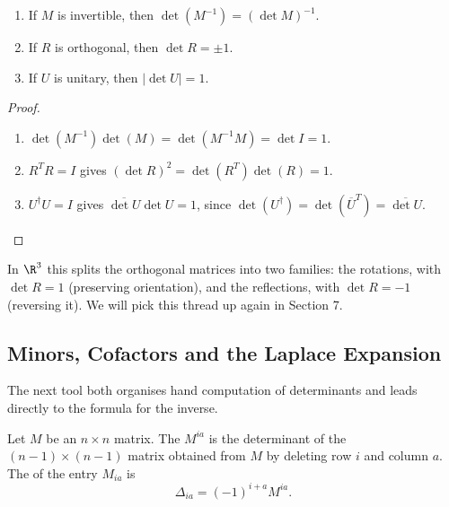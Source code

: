 \begin{corollary}
	\begin{enumerate}[label=(\roman*)]
		\item If $M$ is invertible, then $\det (M^{-1}) = (\det M)^{-1}$.
		\item If $R$ is orthogonal, then $\det R = \pm 1$.
		\item If $U$ is unitary, then $|\det U| = 1$.
	\end{enumerate}
\end{corollary}
\begin{proof}
	\begin{enumerate}[label=(\roman*)]
		\item $\det(M^{-1})\det(M) = \det(M^{-1}M) = \det I = 1$.
		\item $R^TR = I$ gives $(\det R)^2 = \det(R^T)\det(R) = 1$.
		\item $U^\dagger U = I$ gives $\overline{\det U} \det U = 1$, since $\det (U^\dagger) = \det(\overline{U}^T) = \overline{\det U}$. \qedhere
	\end{enumerate}
\end{proof}

In $\R^3$ this splits the orthogonal matrices into two families: the rotations, with $\det R = 1$ (preserving orientation), and the reflections, with $\det R = -1$ (reversing it). We will pick this thread up again in Section 7.

\subsection{Minors, Cofactors and the Laplace Expansion}

The next tool both organises hand computation of determinants and leads directly to the formula for the inverse.

\begin{definition}
	Let $M$ be an $n \times n$ matrix. The  $M^{ia}$ is the determinant of the $(n-1) \times (n-1)$ matrix obtained from $M$ by deleting row $i$ and column $a$. The  of the entry $M_{ia}$ is
	$$
	\Delta_{ia} = (-1)^{i + a}M^{ia}.
	$$
\end{definition}

